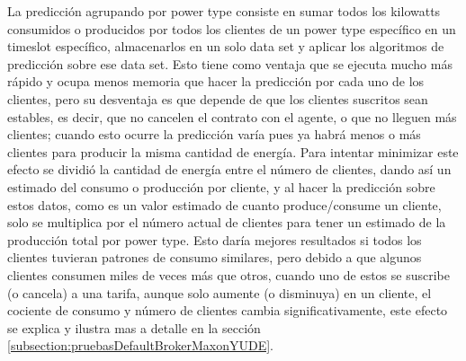 La predicción agrupando por power type consiste en sumar todos los kilowatts consumidos o producidos por todos los clientes de un power type específico en un timeslot específico, almacenarlos en un solo data set y aplicar los algoritmos de predicción sobre ese data set. 
Esto tiene como ventaja que se ejecuta mucho más rápido y ocupa menos memoria que hacer la predicción por cada uno de los clientes, pero su desventaja es que depende de que los clientes suscritos sean estables, es decir, que no cancelen el contrato con el agente, o que no lleguen más clientes; cuando esto ocurre la predicción varía pues ya habrá menos o más clientes para producir la misma cantidad de energía. 
Para  intentar minimizar este efecto se dividió la cantidad de energía entre el número de clientes, dando así un estimado del consumo o producción por cliente, y al hacer la predicción sobre estos datos, como es un valor estimado de cuanto produce/consume un cliente, solo se multiplica por el número actual de clientes para tener un estimado de la producción total por power type. 
Esto daría mejores resultados si todos los clientes tuvieran patrones de consumo similares, pero debido a que algunos clientes consumen miles de veces más que otros, cuando uno de estos se suscribe (o cancela) a una tarifa, aunque solo aumente (o disminuya) en un cliente, el cociente de consumo y número de clientes cambia significativamente, este efecto se explica y ilustra mas a detalle en la sección \ref{subsection:pruebasDefaultBrokerMaxonYUDE}.

